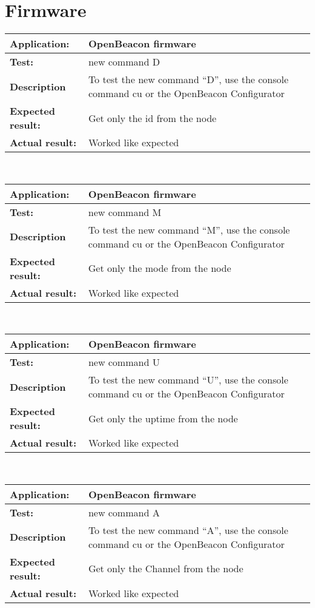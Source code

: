  \section{Firmware}
   \begin{tabular}{|p{3.5cm}|p{10.5cm}|}
    \hline
     \textbf{Application:}	& OpenBeacon firmware\\
    \hline
     \textbf{Test:}		& new command D\\
    \hline
     \textbf{Description}	& To test the new command ``D'', use the console command cu or the OpenBeacon Configurator\\
    \hline
     \textbf{Expected result:}	& Get only the id from the node\\
    \hline
     \textbf{Actual result:}	& Worked like expected\\
    \hline
   \end{tabular}\\
   \begin{tabular}{|p{3.5cm}|p{10.5cm}|}
    \hline
     \textbf{Application:}	& OpenBeacon firmware\\
    \hline
     \textbf{Test:}		& new command M\\
    \hline
     \textbf{Description}	& To test the new command ``M'', use the console command cu or the OpenBeacon Configurator\\
    \hline
     \textbf{Expected result:}	& Get only the mode from the node\\
    \hline
     \textbf{Actual result:}	& Worked like expected\\
    \hline
   \end{tabular}\\
   \begin{tabular}{|p{3.5cm}|p{10.5cm}|}
    \hline
     \textbf{Application:}	& OpenBeacon firmware\\
    \hline
     \textbf{Test:}		& new command U\\
    \hline
     \textbf{Description}	& To test the new command ``U'', use the console command cu or the OpenBeacon Configurator\\
    \hline
     \textbf{Expected result:}	& Get only the uptime from the node\\
    \hline
     \textbf{Actual result:}	& Worked like expected\\
    \hline
   \end{tabular}\\
   \begin{tabular}{|p{3.5cm}|p{10.5cm}|}
    \hline
     \textbf{Application:}	& OpenBeacon firmware\\
    \hline
     \textbf{Test:}		& new command A\\
    \hline
     \textbf{Description}	& To test the new command ``A'', use the console command cu or the OpenBeacon Configurator\\
    \hline
     \textbf{Expected result:}	& Get only the Channel from the node\\
    \hline
     \textbf{Actual result:}	& Worked like expected\\
    \hline
   \end{tabular}\\
